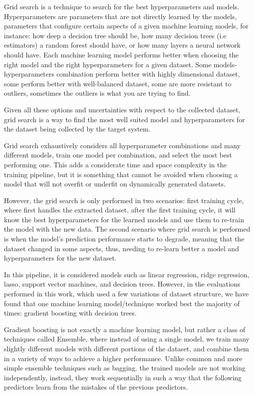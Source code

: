 Grid search is a technique to search for the best hyperparameters and models. Hyperparameters are parameters that are not directly learned by the models, parameters that configure certain aspects of a given machine learning models, for instance: how deep a decision tree should be, how many decision trees (i.e estimators) a random forest should have, or how many layers a neural network should have. Each machine learning model performs better when choosing the right model and the right hyperparameters for a given dataset. Some models-hyperparameters combination perform better with highly dimensional dataset, some perform better with well-balanced dataset, some are more resistant to outliers, sometimes the outliers is what you are trying to find. 

Given all these options and uncertainties with respect to the collected dataset, grid search is a way to find the most well suited model and hyperparameters for the dataset being collected by the target system.

Grid search exhaustively considers all hyperparameter combinations and many different models, train one model per combination, and select the most best performing one. This adds a considerate time and space complexity in the training pipeline, but it is something that cannot be avoided when choosing a model that will not overfit or underfit on dynamically generated datasets. 

However, the grid search is only performed in two scenarios: first training cycle, where \projectname{} first handles the extracted dataset, after the first training cycle, it will know the best hyperparameters for the learned models and use them to re-train the model with the new data. The second scenario where grid search is performed is when the model's prediction performance starts to degrade, meaning that the dataset changed in some aspects, thus, needing to re-learn better a model and hyperparameters for the new dataset.

In this pipeline, it is considered models such as linear regression, ridge regression, lasso, support vector machines, and decision trees. However, in the evaluations performed in this work, which used a few variations of dataset structure, we have found that one machine learning model/technique worked best the majority of times: gradient boosting with decision trees. 

Gradient boosting is not exactly a machine learning model, but rather a class of techniques called Ensemble, where instead of using a single model, we train many slightly different models with different portions of the dataset, and combine them in a variety of ways to achieve a higher performance. Unlike common and more simple ensemble techniques such as bagging. the trained models are not working independently, instead, they work sequentially in such a way that the following predictors learn from the mistakes of the previous predictors.


